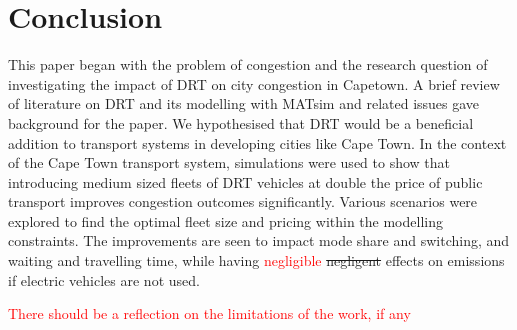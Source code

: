 \documentclass[main.tex]{subfiles}
\begin{document}
\section*{Conclusion}
This paper began with the problem of congestion and the research question of investigating the impact of DRT on city congestion in Capetown. A brief review of literature on DRT and its modelling with MATsim and related issues gave background for the paper. We hypothesised that DRT would be a beneficial addition to transport systems in developing cities like Cape Town. In the context of the Cape Town transport system, simulations were used to show that introducing medium sized fleets of DRT vehicles at double the price of public transport improves congestion outcomes significantly. Various scenarios were explored to find the optimal fleet size and pricing within the modelling constraints. The improvements are seen to impact mode share and switching, and waiting and travelling time, while having \textcolor{red}{negligible} \st{negligent} effects on emissions if electric vehicles are not used. 

\textcolor{red}{There should be a reflection on the limitations of the work, if any}
\end{document}
